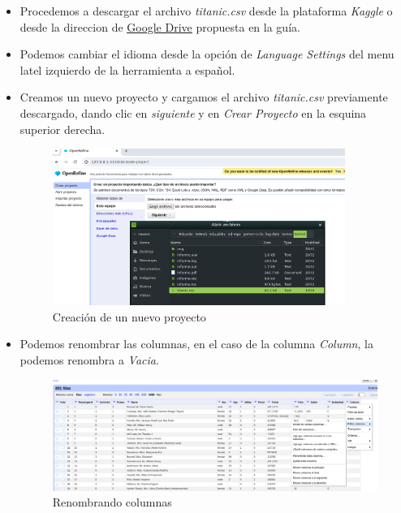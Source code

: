 \documentclass[12pt]{article}
\begin{document}
\begin{itemize}
                    \item Procedemos a descargar el archivo \textit{titanic.csv} desde la plataforma \textit{Kaggle} o desde la direccion de \href{https://drive.google.com/file/d/18GdoN1tn_qFFuMn014JFniuoTv4uxrh-/view}{\uline{Google Drive}} propuesta en la guía.
                    \item Podemos cambiar el idioma desde la opción de \textit{Language Settings} del menu latel izquierdo de la herramienta a español.
                    \item Creamos un nuevo proyecto y cargamos el archivo \textit{titanic.csv} previamente descargado, dando clic en \textit{siguiente} y en \textit{Crear Proyecto} en la esquina superior derecha.
                        \begin{figure}[!h]
                            \centering
                            \includegraphics[width=0.9\textwidth]{img/openrefine-7.png}
                            \caption{Creación de un nuevo proyecto}
                        \end{figure}
                    
                    \item Podemos renombrar las columnas, en el caso de la columna \textit{Column}, la podemos renombra a \textit{Vacia}.
                        \begin{figure}[!h]
                            \centering
                            \includegraphics[width=1\textwidth]{img/openrefine-8.png}
                            \caption{Renombrando columnas}
                        \end{figure}
                   

\end{itemize}
\end{document}
